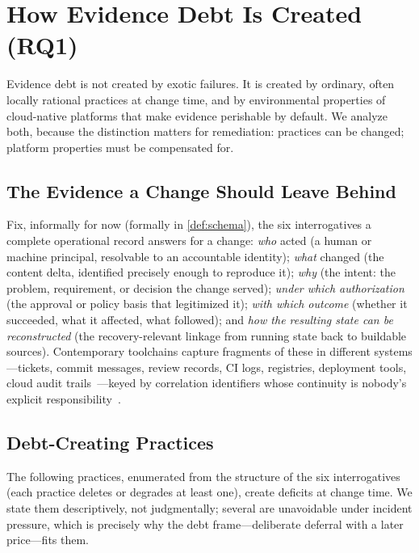 \section{How Evidence Debt Is Created (RQ1)}
\label{sec:conditions}

Evidence debt is not created by exotic failures. It is created by ordinary, often
locally rational practices at change time, and by environmental properties of
cloud-native platforms that make evidence perishable by default. We analyze both,
because the distinction matters for remediation: practices can be changed; platform
properties must be compensated for.

\subsection{The Evidence a Change Should Leave Behind}
\label{sec:schema-informal}

Fix, informally for now (formally in \cref{def:schema}), the six interrogatives a
complete operational record answers for a change: \emph{who} acted (a human or
machine principal, resolvable to an accountable identity); \emph{what} changed (the
content delta, identified precisely enough to reproduce it); \emph{why} (the intent:
the problem, requirement, or decision the change served); \emph{under which
authorization} (the approval or policy basis that legitimized it); \emph{with which
outcome} (whether it succeeded, what it affected, what followed); and \emph{how the
resulting state can be reconstructed} (the recovery-relevant linkage from running
state back to buildable sources). Contemporary toolchains capture fragments of these
in different systems---tickets, commit messages, review records, CI logs, registries,
deployment tools, cloud audit trails~\cite{cloudtrail,ghdocs}---keyed by correlation
identifiers whose continuity is nobody's explicit responsibility~\cite{sigelman2010,
otel}.

\subsection{Debt-Creating Practices}
\label{sec:practices}

The following practices, enumerated from the structure of the six interrogatives
(each practice deletes or degrades at least one), create deficits at change time.
We state them descriptively, not judgmentally; several are unavoidable under
incident pressure, which is precisely why the debt frame---deliberate deferral with
a later price---fits them.

